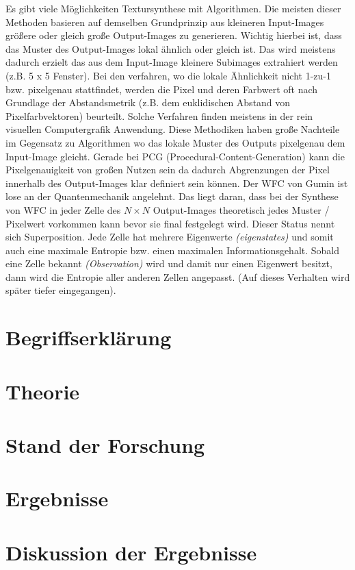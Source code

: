\documentclass[12pt]{report}
\begin{document}
Es gibt viele Möglichkeiten Textursynthese mit Algorithmen.
Die meisten dieser Methoden basieren auf demselben Grundprinzip aus kleineren Input-Images größere oder gleich große Output-Images zu generieren.
Wichtig hierbei ist, dass das Muster des Output-Images lokal ähnlich oder gleich ist.
Das wird meistens dadurch erzielt das aus dem Input-Image kleinere Subimages extrahiert werden {(z.B. 5 x 5 Fenster)}.
Bei den verfahren, wo die lokale Ähnlichkeit nicht 1-zu-1 bzw. pixelgenau stattfindet, werden die Pixel und deren Farbwert oft nach Grundlage der Abstandsmetrik {(z.B. dem euklidischen Abstand von Pixelfarbvektoren)} beurteilt.
Solche Verfahren finden meistens in der rein visuellen Computergrafik Anwendung.
Diese Methodiken haben große Nachteile im Gegensatz zu Algorithmen wo das lokale Muster des Outputs pixelgenau dem Input-Image gleicht.
Gerade bei PCG {(Procedural-Content-Generation)} kann die Pixelgenauigkeit von großen Nutzen sein da dadurch Abgrenzungen der Pixel innerhalb des Output-Images klar definiert sein können.
Der WFC von Gumin ist lose an der Quantenmechanik angelehnt.
Das liegt daran, dass bei der Synthese von WFC in jeder Zelle des $N\times N$ Output-Images theoretisch jedes Muster / Pixelwert vorkommen kann bevor sie final festgelegt wird.
Dieser Status nennt sich Superposition.
Jede Zelle hat mehrere Eigenwerte \textit{(eigenstates)} und somit auch eine maximale Entropie bzw. einen maximalen Informationsgehalt.
Sobald eine Zelle bekannt \textit{(Observation)} wird und damit nur einen Eigenwert besitzt, dann wird die Entropie aller anderen Zellen angepasst.
{(Auf dieses Verhalten wird später tiefer eingegangen)}.



{\let\clearpage\relax\chapter{Begriffserklärung}}

{\let\clearpage\relax\chapter{Theorie}}
{\let\clearpage\relax\chapter{Stand der Forschung}}
{\let\clearpage\relax\chapter{Ergebnisse}}
{\let\clearpage\relax\chapter{Diskussion der Ergebnisse}}
\end{document}
